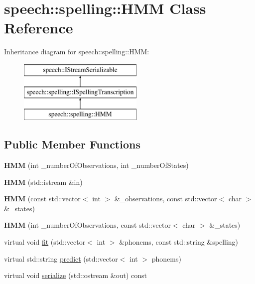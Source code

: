 \hypertarget{classspeech_1_1spelling_1_1HMM}{\section{speech\+:\+:spelling\+:\+:H\+M\+M Class Reference}
\label{classspeech_1_1spelling_1_1HMM}
}
Inheritance diagram for speech\+:\+:spelling\+:\+:H\+M\+M\+:\begin{figure}[H]
\begin{center}
\leavevmode
\includegraphics[height=3.000000cm]{classspeech_1_1spelling_1_1HMM}
\end{center}
\end{figure}
\subsection*{Public Member Functions}
\begin{DoxyCompactItemize}
\item 
\hypertarget{classspeech_1_1spelling_1_1HMM_ab6f28924b586c22b958bfac269b10f8b}{{\bfseries H\+M\+M} (int \+\_\+number\+Of\+Observations, int \+\_\+number\+Of\+States)}\label{classspeech_1_1spelling_1_1HMM_ab6f28924b586c22b958bfac269b10f8b}

\item 
\hypertarget{classspeech_1_1spelling_1_1HMM_a2165a35f20a11ff5942480a75471cafd}{{\bfseries H\+M\+M} (std\+::istream \&in)}\label{classspeech_1_1spelling_1_1HMM_a2165a35f20a11ff5942480a75471cafd}

\item 
\hypertarget{classspeech_1_1spelling_1_1HMM_ab7deb7571c4544319d268de72bfaa599}{{\bfseries H\+M\+M} (const std\+::vector$<$ int $>$ \&\+\_\+observations, const std\+::vector$<$ char $>$ \&\+\_\+states)}\label{classspeech_1_1spelling_1_1HMM_ab7deb7571c4544319d268de72bfaa599}

\item 
\hypertarget{classspeech_1_1spelling_1_1HMM_a84914784a009bf5ae2729afce623a770}{{\bfseries H\+M\+M} (int \+\_\+number\+Of\+Observations, const std\+::vector$<$ char $>$ \&\+\_\+states)}\label{classspeech_1_1spelling_1_1HMM_a84914784a009bf5ae2729afce623a770}

\item 
virtual void \hyperlink{classspeech_1_1spelling_1_1HMM_ae8a7d3797ef1f8d8ac3966db5500c552}{fit} (std\+::vector$<$ int $>$ \&phonems, const std\+::string \&spelling)
\item 
virtual std\+::string \hyperlink{classspeech_1_1spelling_1_1HMM_a01f7b06d7868bb526ca74526570dce21}{predict} (std\+::vector$<$ int $>$ phonems)
\item 
virtual void \hyperlink{classspeech_1_1spelling_1_1HMM_a225d39c70f721195c184e8af00ec3651}{serialize} (std\+::ostream \&out) const 
\end{DoxyCompactItemize}
